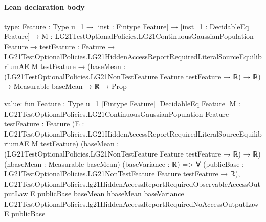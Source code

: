 \documentclass[10pt]{article}
\begin{document}
\paragraph{Lean declaration body}
\begin{ReviewVerbatim}
type:
{Feature : Type u_1} →
  [inst : Fintype Feature] →
    [inst_1 : DecidableEq Feature] →
      {M : LG21TestOptionalPolicies.LG21ContinuousGaussianPopulation Feature} →
        {testFeature : Feature} →
          LG21TestOptionalPolicies.LG21HiddenAccessReportRequiredLiteralSourceEquilibriumAE M testFeature →
            (baseMean : (LG21TestOptionalPolicies.LG21NonTestFeature Feature testFeature → ℝ) → ℝ) →
              Measurable baseMean → ℝ → Prop

value:
fun {Feature : Type u_1} [Fintype Feature] [DecidableEq Feature]
    {M : LG21TestOptionalPolicies.LG21ContinuousGaussianPopulation Feature} {testFeature : Feature}
    (E : LG21TestOptionalPolicies.LG21HiddenAccessReportRequiredLiteralSourceEquilibriumAE M testFeature)
    (baseMean : (LG21TestOptionalPolicies.LG21NonTestFeature Feature testFeature → ℝ) → ℝ)
    (hbaseMean : Measurable baseMean) (baseVariance : ℝ) =>
  ∀ (publicBase : LG21TestOptionalPolicies.LG21NonTestFeature Feature testFeature → ℝ),
    LG21TestOptionalPolicies.lg21HiddenAccessReportRequiredObservableAccessOutputLaw E publicBase baseMean hbaseMean
        baseVariance =
      LG21TestOptionalPolicies.lg21HiddenAccessReportRequiredNoAccessOutputLaw E publicBase
\end{ReviewVerbatim}
\end{document}
